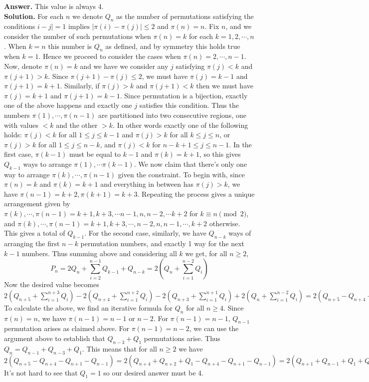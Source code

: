 \documentclass[11pt,a4paper]{article}
\begin{document}
\begin{enumerate}
	\textbf{Answer.} This value is always 4. \\
	\textbf{Solution.} For each $n$ we denote $Q_n$ as the number of permutations satisfying the conditions $i-j|=1\text{ implies }|\pi(i)-\pi(j)|\le 2$ and $\pi(n)=n$. Fix $n$, and we consider the number of such permutations when $\pi(n)=k$ for each $k=1, 2, \cdots , n$. When $k=n$ this number is $Q_n$ as defined, and by symmetry this holds true when $k=1$. Hence we proceed to consider the cases when $\pi(n)=2, \cdots , n-1$. Now, denote $\pi(n)=k$ and we have we consider any $j$ satisfying $\pi(j)<k$ and $\pi(j+1)>k$. Since $\pi(j+1)-\pi(j)\le 2$, we must have $\pi(j)=k-1$ and $\pi(j+1)=k+1$. Similarly, if $\pi(j)>k$ and $\pi(j+1)<k$ then we must have $\pi(j)=k+1$ and $\pi(j+1)=k-1$. Since permutation is a bijection, exactly one of the above happens and exactly one $j$ satisfies this condition. Thus the numbers $\pi(1), \cdots , \pi(n-1)$ are partitioned into two consecutive regions, one with values $<k$ and the other $>k$. In other words exactly one of the following holds: $\pi(j)<k$ for all $1\le j\le k-1$ and $\pi(j)>k$ for all $k\le j\le n$, or $\pi(j)>k$ for all $1\le j\le n-k$, and $\pi(j)<k$ for $n-k+1\le j\le n-1$. In the first case, $\pi(k-1)$ must be equal to $k-1$ and $\pi(k)=k+1$, so this gives $Q_{k-1}$ ways to arrange $\pi(1), \cdots \pi(k-1)$. We now claim that there's only one way to arrange $\pi(k), \cdots , \pi(n-1)$ given the constraint. To begin with, since $\pi(n)=k$ and $\pi(k)=k+1$ and everything in between has $\pi(j)>k$, we have 
	$\pi(n-1)=k+2, \pi(k+1)=k+3$. Repeating the process gives a unique arrangement given by 
	$\pi(k), \cdots , \pi(n-1)=k+1, k+3, \cdots n-1, n, n-2, \cdots k+2$ for $k\equiv n\pmod{2}$, and $\pi(k), \cdots , \pi(n-1)=k+1, k+3, \cdots , n-2, n, n-1, \cdots , k+2$ otherwise. This gives a total of $Q_{k-1}$. For the second case, similarly, we have $Q_{n-k}$ ways of arranging the first $n-k$ permutation numbers, and exactly 1 way for the next $k-1$ numbers. Thus summing above and considering all $k$ we get, for all $n\ge 2$,  
	\[P_n=2Q_n+\sum_{i=2}^{n-1}Q_{k-1}+Q_{n-k}=2(Q_n+\sum_{i=1}^{n-2} Q_i)\]
	Now the desired value becomes 
	$2(Q_{n+5}+\sum_{i=1}^{n+3} Q_i )- 2(Q_{n+4}+\sum_{i=1}^{n+2} Q_i)-2(Q_{n+3}+\sum_{i=1}^{n+1} Q_i)+2(Q_n+\sum_{i=1}^{n-2} Q_i)
	=2(Q_{n+5}-Q_{n+4}-Q_{n+1}-Q_{n-1})
	$
	To calculate the above, we find an iterative formula for $Q_n$ for all $n\ge 4$. Since $\pi(n)=n$, we have $\pi(n-1)=n-1$ or $n-2$. For $\pi(n-1)=n-1$, $Q_{n-1}$ permutation arises as claimed above. For $\pi(n-1)=n-2$, we can use the argument above to establish that $Q_{n-3}+Q_1$ permutations arise. Thus $Q_n=Q_{n-1}+Q_{n-3}+Q_1$. This means that for all $n\ge 2$ we have 
	$2(Q_{n+5}-Q_{n+4}-Q_{n+1}-Q_{n-1})
	=2(Q_{n+4}+Q_{n+2}+Q_1-Q_{n+4}-Q_{n+1}-Q_{n-1})
	=2(Q_{n+1}+Q_{n-1}+Q_1+Q_1-Q_{n+1}-Q_{n-1})
	=4Q_1.
	$
	It's not hard to see that $Q_1=1$ so our desired answer must be 4. 
	
\end{enumerate}
\end{document}
